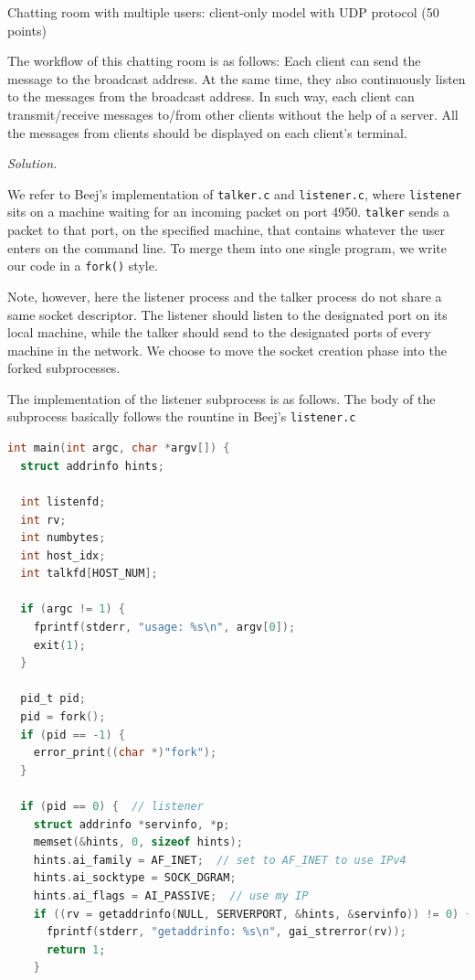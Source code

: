 \begin{exercise}[]{Chatting room with multiple users: client-only model with UDP protocol (50 points)
  
  The workflow of this chatting room is as follows: Each client can send the message to the broadcast address. At the same time, they also continuously listen to the messages from the broadcast address. In such way, each client can transmit/receive messages to/from other clients without the help of a server. All the messages from clients should be displayed on each client’s terminal.

  }

\noindent\emph{Solution.}

We refer to Beej's implementation of \texttt{talker.c} and \texttt{listener.c}, where \texttt{listener} sits on a machine waiting for an incoming packet on port 4950. \texttt{talker} sends a packet to that port, on the specified machine, that contains whatever the user enters on the command line. To merge them into one single program, we write our code in a \texttt{fork()} style.

Note, however, here the listener process and the talker process do not share a same socket descriptor. The listener should listen to the designated port on its local machine, while the talker should send to the designated ports of every machine in the network. We choose to move the socket creation phase into the forked subprocesses.

The implementation of the listener subprocess is as follows. The body of the subprocess basically follows the rountine in Beej's \texttt{listener.c}


\begin{lstlisting}[language=C]
int main(int argc, char *argv[]) {
  struct addrinfo hints;

  int listenfd;
  int rv;
  int numbytes;
  int host_idx;
  int talkfd[HOST_NUM];

  if (argc != 1) {
    fprintf(stderr, "usage: %s\n", argv[0]);
    exit(1);
  }

  pid_t pid;
  pid = fork();
  if (pid == -1) {
    error_print((char *)"fork");
  }

  if (pid == 0) {  // listener
    struct addrinfo *servinfo, *p;
    memset(&hints, 0, sizeof hints);
    hints.ai_family = AF_INET;  // set to AF_INET to use IPv4
    hints.ai_socktype = SOCK_DGRAM;
    hints.ai_flags = AI_PASSIVE;  // use my IP
    if ((rv = getaddrinfo(NULL, SERVERPORT, &hints, &servinfo)) != 0) {
      fprintf(stderr, "getaddrinfo: %s\n", gai_strerror(rv));
      return 1;
    }


\end{lstlisting}
\end{exercise}
